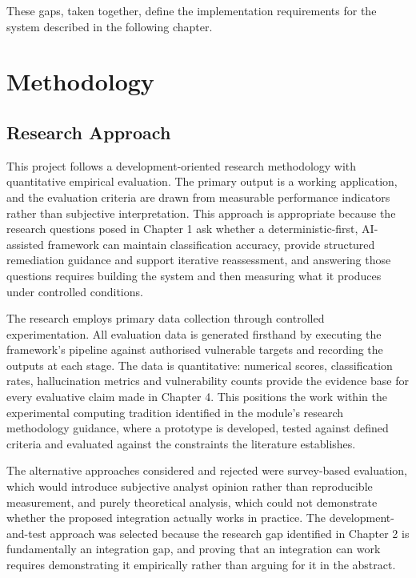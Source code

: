 \documentclass[12pt, a4paper, oneside]{report}
\begin{document}
These gaps, taken together, define the implementation requirements for
the system described in the following chapter.



\chapter{Methodology}
\label{chap:method}

\section{Research Approach}

This project follows a development-oriented research methodology with quantitative empirical evaluation. The primary output is a working application, and the evaluation criteria are drawn from measurable performance indicators rather than subjective interpretation. This approach is appropriate because the research questions posed in Chapter 1 ask whether a deterministic-first, AI-assisted framework can maintain classification accuracy, provide structured remediation guidance and support iterative reassessment, and answering those questions requires building the system and then measuring what it produces under controlled conditions.

The research employs primary data collection through controlled experimentation. All evaluation data is generated firsthand by executing the framework's pipeline against authorised vulnerable targets and recording the outputs at each stage. The data is quantitative: numerical scores, classification rates, hallucination metrics and vulnerability counts provide the evidence base for every evaluative claim made in Chapter 4. This positions the work within the experimental computing tradition identified in the module's research methodology guidance, where a prototype is developed, tested against defined criteria and evaluated against the constraints the literature establishes.

The alternative approaches considered and rejected were survey-based evaluation, which would introduce subjective analyst opinion rather than reproducible measurement, and purely theoretical analysis, which could not demonstrate whether the proposed integration actually works in practice. The development-and-test approach was selected because the research gap identified in Chapter 2 is fundamentally an integration gap, and proving that an integration can work requires demonstrating it empirically rather than arguing for it in the abstract.
\end{document}
